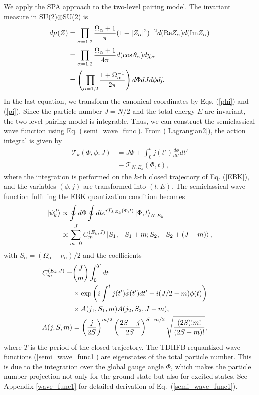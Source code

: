 \documentclass[11pt]{book} %
\begin{document}
We apply the SPA approach to the two-level pairing model.
The invariant measure in SU(2)$\otimes$SU(2) is 
\begin{align}
d\mu(Z) &= \prod_{\alpha=1,2} \frac{\Omega_{\alpha}+1}{\pi}(1+|Z_{\alpha}|^2)^{-2}d({\rm Re}Z_{\alpha})d({\rm Im}Z_{\alpha}) \nonumber \\
  &= \prod_{\alpha=1,2} \frac{\Omega_{\alpha}+1}{4\pi}d(\cos{\theta_{\alpha}})d\chi_{\alpha} \nonumber \\
	&= \left(\prod_{\alpha=1,2} \frac{1+\Omega_{\alpha}^{-1}}{2\pi}\right)
             d\Phi dJ d\phi dj .
\end{align}
In the last equation, we transform the canonical coordinates
by Eqs. (\ref{phi}) and (\ref{pi}).
Since the particle number $J=N/2$ and the total energy $E$ are invariant,
the two-level pairing model is integrable.
Thus, we can construct the semiclassical wave function using
Eq. (\ref{semi_wave_func}).
From (\ref{Lagrangian2}), the action integral is given by
\begin{align}
	\mathcal{T}_k(\Phi,\phi;J)
	&= J\Phi + \int^t_0
	j(t') \frac{d\phi}{dt'} dt' \nonumber \\
	&\equiv \mathcal{T}_{N,E_k}(\Phi,t) ,
\end{align}
where the integration is performed on the $k$-th
closed trajectory of Eq. (\ref{EBK}), and
the variables $(\phi,j)$ are transformed into $(t,E)$.
The semiclassical wave function fulfilling the EBK quantization condition
becomes
\begin{align}
	\ket{\psi_k^J} &\propto \oint d\Phi \oint dt
	e^{i\mathcal{T}_{J,E_k}(\Phi, t)}
	\ket{\Phi,t}_{N,E_k} \label{semi_wave_func0} \\
  &\propto \sum_{m=0}^{J}C_m^{(E_k,J)}\ket{S_1,-S_1+m;S_2,-S_2+(J-m)} ,
	\label{semi_wave_func1}
\end{align}
with $S_{\alpha}=(\Omega_{\alpha}-\nu_{\alpha})/2$ and the coefficients
\begin{align}
  C_m^{(E_k,J)} =& \binom{J}{m}\int_0^T dt \nonumber \\
 &\times \exp{\left( i\int^t j(t') \dot{\phi}(t') dt'-i(J/2-m)\phi(t) \right)} \nonumber \\ 
 &\times A(j_1,S_1,m)A(j_2,S_2,J-m) ,\\
  A(j,S,m) &= \left(\frac{j}{2S}\right)^{m/2}\left(\frac{2S-j}{2S}\right)^{S-m/2}\sqrt{\frac{(2S)!m!}{(2S-m)!}}, \hspace{5mm} \nonumber
\end{align}
where $T$ is the period of the closed trajectory.
The TDHFB-requantized wave functions (\ref{semi_wave_func1}) are
eigenstates of the total particle number.
This is due to the integration over the global gauge angle $\Phi$,
which makes the particle number projection not only for the ground state
but also for excited states.
See Appendix \ref{wave_func1} for detailed derivation of Eq.~(\ref{semi_wave_func1}). 
\end{document}
